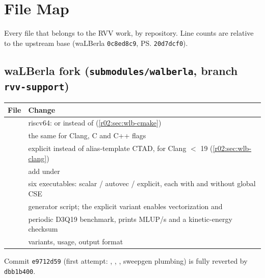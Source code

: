 \chapter{File Map}\label{r02:app:file-map}

Every file that belongs to the RVV work, by repository. Line counts are relative to the
upstream base (waLBerla \texttt{0c8ed8c9}, \ps{} \texttt{20d7dcf0}).

\section*{waLBerla fork (\texttt{submodules/walberla}, branch \texttt{rvv-support})}
\begin{xltabular}{\linewidth}{@{}>{\raggedright\arraybackslash}p{7.6cm}>{\raggedright\arraybackslash}X@{}}
  \toprule
  \textbf{File} & \textbf{Change}\\
  \midrule
  \endhead
   & riscv64:  or
     instead of  (\cref{r02:sec:wlb-cmake})\\
   & the same for Clang, C and C++ flags\\
   & explicit
     instead of alias-template CTAD, for Clang $<$ 19
    (\cref{r02:sec:wlb-clang})\\
   & add  under
    \\
   & six executables: scalar /
    autovec / explicit, each with and without global CSE\\
   & generator script; the
    explicit variant enables vectorization and \\
   & periodic D3Q19 benchmark,
    prints MLUP/s and a kinetic-energy checksum\\
   & variants, usage, output format\\
  \bottomrule
\end{xltabular}
Commit \texttt{e9712d59} (first attempt: ,
, , sweepgen plumbing) is fully reverted by \texttt{dbb1b400}.

